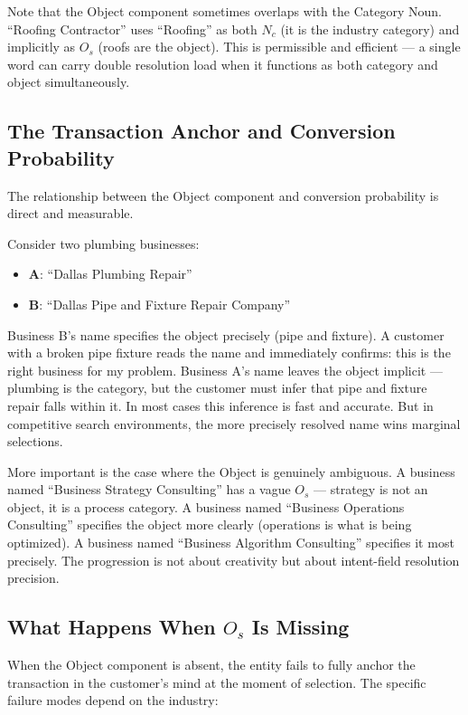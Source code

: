 \documentclass[12pt, openany]{book}
\theoremstyle{thmstyle}
\theoremstyle{defstyle}
\newcommand{\Nc}{N_c}
\newcommand{\Os}{O_s}
\begin{document}
Note that the Object component sometimes overlaps with the Category Noun. ``Roofing Contractor'' uses ``Roofing'' as both $\Nc$ (it is the industry category) and implicitly as $\Os$ (roofs are the object). This is permissible and efficient --- a single word can carry double resolution load when it functions as both category and object simultaneously.

\subsection{The Transaction Anchor and Conversion Probability}

The relationship between the Object component and conversion probability is direct and measurable.

Consider two plumbing businesses:
\begin{itemize}[leftmargin=1.5em]
  \item \textbf{A}: ``Dallas Plumbing Repair''
  \item \textbf{B}: ``Dallas Pipe and Fixture Repair Company''
\end{itemize}

Business B's name specifies the object precisely (pipe and fixture). A customer with a broken pipe fixture reads the name and immediately confirms: this is the right business for my problem. Business A's name leaves the object implicit --- plumbing is the category, but the customer must infer that pipe and fixture repair falls within it. In most cases this inference is fast and accurate. But in competitive search environments, the more precisely resolved name wins marginal selections.

More important is the case where the Object is genuinely ambiguous. A business named ``Business Strategy Consulting'' has a vague $\Os$ --- strategy is not an object, it is a process category. A business named ``Business Operations Consulting'' specifies the object more clearly (operations is what is being optimized). A business named ``Business Algorithm Consulting'' specifies it most precisely. The progression is not about creativity but about intent-field resolution precision.

\subsection{What Happens When $O_s$ Is Missing}

When the Object component is absent, the entity fails to fully anchor the transaction in the customer's mind at the moment of selection. The specific failure modes depend on the industry:
\end{document}
